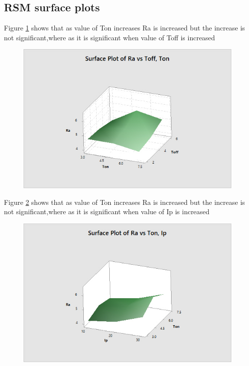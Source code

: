 \documentclass[suppldata]{interact}
\begin{document}
\subsection{RSM surface plots}

Figure \ref{fig:ToffTon} shows that as value of Ton increases Ra is increased but the increase is not significant,where  as it is significant when value of Toff is increased
  \begin{figure}[htbp]
    \centering
    \includegraphics[width=\textwidth]{MMP_3D_Ra_Toff_Ton.jpg}
    \label{fig:ToffTon}
  \end{figure}
 
 Figure \ref{fig:IpTon} shows that as value of Ton increases Ra is increased but the increase is not significant,where  as it is significant when value of Ip is increased
 \begin{figure}[htbp]
    \centering
    \includegraphics[width=\textwidth]{MMP_3D_Ra_Ip_Ton.jpg}
  \label{fig:IpTon}
  \end{figure}
\end{document}
